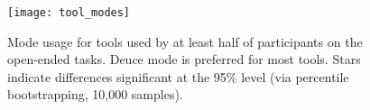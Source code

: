 \begin{figure}
\texttt{[image: tool\_modes]}
\caption{Mode usage for tools used by at least half of participants on the open-ended tasks. Deuce mode is preferred for most tools.
Stars indicate differences significant at the 95\% level (via percentile bootstrapping, 10,000 samples).}
\label{fig:tool_modes}
\end{figure}
